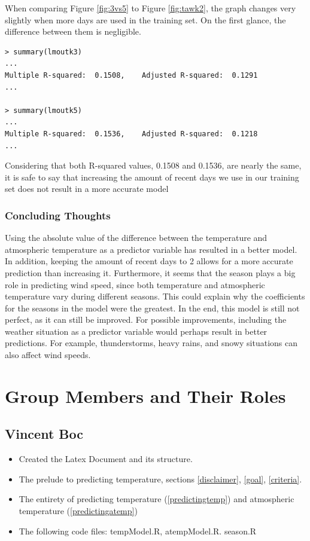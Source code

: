 \documentclass[12pt]{article}
\begin{document}
When comparing Figure \ref{fig:3vs5} to Figure \ref{fig:tawk2}, the graph changes very slightly when more days are used in the training set. On the first glance, the difference between them is negligible.

\begin{verbatim}
> summary(lmoutk3)
...
Multiple R-squared:  0.1508,	Adjusted R-squared:  0.1291 
...

> summary(lmoutk5)
...
Multiple R-squared:  0.1536,	Adjusted R-squared:  0.1218 
...
\end{verbatim}
Considering that both R-squared values, 0.1508 and 0.1536, are nearly the same, it is safe to say that increasing the amount of recent days we use in our training set does not result in a more accurate model

\subsubsection{Concluding Thoughts}

Using the absolute value of the difference between the temperature and atmospheric temperature as a predictor variable has resulted in a better model. In addition, keeping the amount of recent days to 2 allows for a more accurate prediction than increasing it. Furthermore, it seems that the season plays a big role in predicting wind speed, since both temperature and atmospheric temperature vary during different seasons. This could explain why the coefficients for the seasons in the model were the greatest. In the end, this model is still not perfect, as it can still be improved. For possible improvements, including the weather situation as a predictor variable would perhaps result in better predictions. For example, thunderstorms, heavy rains, and snowy situations can also affect wind speeds. 

\newpage
\section{Group Members and Their Roles}
\subsection*{Vincent Boc}
\begin{itemize}
\item Created the Latex Document and its structure.
\item The prelude to predicting temperature, sections \ref{disclaimer}, \ref{goal}, \ref{criteria}.
\item The entirety of predicting temperature (\ref{predictingtemp}) and atmospheric temperature (\ref{predictingatemp})
\item The following code files: tempModel.R, atempModel.R. season.R
\end{itemize}
\end{document}
